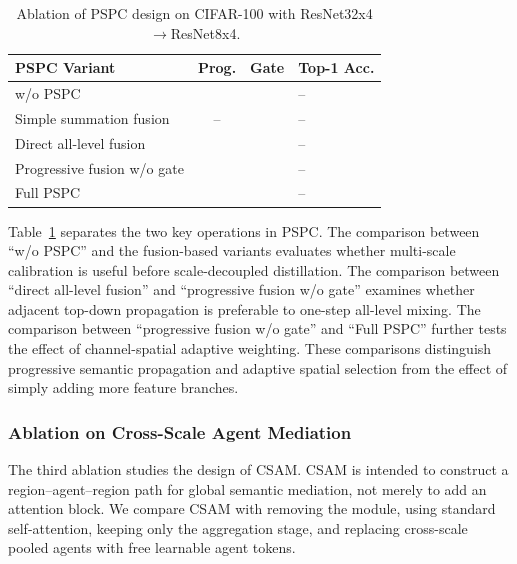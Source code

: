 \documentclass[a4paper,fleqn]{cas-dc}
\newcommand{\cmark}{\ding{51}}
\newcommand{\xmark}{\ding{55}}
\begin{document}
\begin{table}[pos=t]
\centering
\footnotesize
\caption{Ablation of PSPC design on CIFAR-100 with ResNet32x4$\rightarrow$ResNet8x4.}
\label{tab:ablation_apf_design}
\setlength{\tabcolsep}{4pt}
\renewcommand{\arraystretch}{1.08}
\begin{tabular}{@{}>{\raggedright\arraybackslash}p{}cc>{\centering\arraybackslash}p{}@{}}
\toprule
\textbf{PSPC Variant} & \textbf{Prog.} & \textbf{Gate} & \textbf{Top-1 Acc.} \\
\midrule
w/o PSPC                    & \xmark & \xmark & -- \\
Simple summation fusion     & --     & \xmark & -- \\
Direct all-level fusion     & \xmark & \cmark & -- \\
Progressive fusion w/o gate & \cmark & \xmark & -- \\
Full PSPC                   & \cmark & \cmark & -- \\
\bottomrule
\end{tabular}
\end{table}

Table~\ref{tab:ablation_apf_design} separates the two key operations in PSPC.
The comparison between ``w/o PSPC'' and the fusion-based variants evaluates
whether multi-scale calibration is useful before scale-decoupled
distillation. The comparison between ``direct all-level fusion'' and
``progressive fusion w/o gate'' examines whether adjacent top-down
propagation is preferable to one-step all-level mixing. The comparison
between ``progressive fusion w/o gate'' and ``Full PSPC'' further tests the
effect of channel-spatial adaptive weighting. These comparisons distinguish
progressive semantic propagation and adaptive spatial selection from the
effect of simply adding more feature branches.

\subsubsection{Ablation on Cross-Scale Agent Mediation}

The third ablation studies the design of CSAM. CSAM is intended to construct
a region--agent--region path for global semantic mediation, not merely to add
an attention block. We compare CSAM with removing the module, using standard
self-attention, keeping only the aggregation stage, and replacing
cross-scale pooled agents with free learnable agent tokens.
\end{document}
